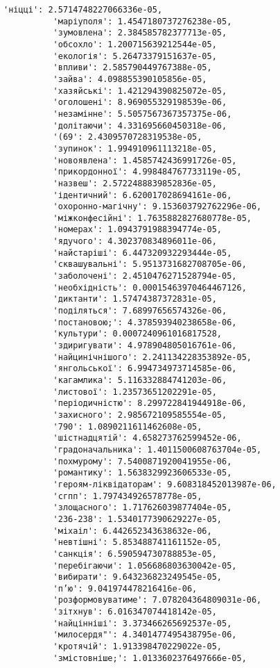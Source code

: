 \documentclass[11pt]{article}
\begin{document}
\begin{Verbatim}[commandchars=\\\{\}]
          'ніцці': 2.5714748227066336e-05,
          'маріуполя': 1.4547180737276238e-05,
          'зумовлена': 2.384585782377713e-05,
          'обсохло': 1.200715639212544e-05,
          'екологія': 5.26473379151637e-05,
          'впливи': 2.585790449767388e-05,
          'зайва': 4.098855390105856e-05,
          'хазяйські': 1.421294390825072e-05,
          'оголошені': 8.969055329198539e-06,
          'незамінне': 5.5057567367357375e-06,
          'долітаючи': 4.331695660450318e-06,
          '(69': 2.4309570728319538e-05,
          'зупинок': 1.994910961113218e-05,
          'новоявлена': 1.4585742436991726e-05,
          'прикордонної': 4.998484767733119e-05,
          'назвеш': 2.5722488839852836e-05,
          'ідентичний': 6.620017028694161e-06,
          'охоронно-магічну': 9.153603792762296e-06,
          'міжконфесійні': 1.7635882827680778e-05,
          'номерах': 1.0943791988394774e-05,
          'ядучого': 4.302370834896011e-06,
          'найстаріші': 6.447320932293444e-05,
          'сквашувальні': 5.9513731682708705e-06,
          'заболочені': 2.4510476271528794e-05,
          'необхідність': 0.00015463970464467126,
          'диктанти': 1.57474387372831e-05,
          'поділяться': 7.68997656574326e-06,
          'постановою;': 4.378593940238658e-06,
          'культури': 0.0007240961016817528,
          'здиригувати': 4.978904805016761e-06,
          'найцинічнішого': 2.241134228353892e-05,
          'янгольської': 6.994734973714585e-06,
          'кагамлика': 5.116332884741203e-06,
          'листової': 1.23573651202291e-05,
          'періодичністю': 8.299722841944918e-06,
          'захисного': 2.985672109585554e-05,
          '790': 1.0890211611462608e-05,
          'шістнадцятій': 4.658273762599452e-06,
          'градоначальника': 1.4011500608763704e-05,
          'похмурому': 7.5400871920041955e-06,
          'романтику': 1.5638329923606533e-05,
          'героям-ліквідаторам': 9.608318452013987e-06,
          'сгпп': 1.797434926578778e-05,
          'злощасного': 1.717626039877404e-05,
          '236-238': 1.5340177390629227e-05,
          'міхаіл': 6.442652343638632e-06,
          'невтішні': 5.853488741161152e-05,
          'санкція': 6.590594730788853e-05,
          'перебігаючи': 1.056686803630042e-05,
          'вибирати': 9.643236823249545e-05,
          'п’ю': 9.041974478216416e-06,
          'розформовуватиме': 7.078204364809031e-06,
          'зітхнув': 6.016347074418142e-05,
          'найцінніші': 3.373466265692537e-05,
          'милосердя"': 4.3401477495438795e-06,
          'кротячій': 1.913398470229022e-05,
          'змістовніше;': 1.0133602376497666e-05,

\end{Verbatim}
\end{document}
